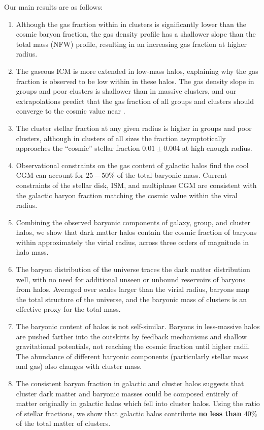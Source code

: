 Our main results are as follows:
\begin{enumerate}
\item Although the gas fraction within \rfive{} in clusters is
  significantly lower than the cosmic baryon fraction, the gas density
  profile has a shallower slope than the total mass (NFW) profile,
  resulting in an increasing gas fraction at higher radius. 
\item The gaseous ICM is more extended in low-mass halos, explaining
  why the gas fraction is observed to be low within \rfive{} in these
  halos. The gas density slope in groups and poor clusters is
  shallower than in massive clusters, and our extrapolations predict that
  the gas fraction of all groups and clusters should converge to the
  cosmic value near \rvir{}.
\item The cluster stellar fraction at any given radius is higher in
  groups and poor clusters, although in clusters of all sizes the
  fraction asymptotically approaches the ``cosmic'' stellar fraction
  $0.01\pm0.004$ at high enough radius. 
\item Observational constraints on the gas content of galactic halos
  find the cool CGM can account for $25-50\%$ of the total baryonic
  mass. Current constraints of the stellar disk, ISM, and multiphase
  CGM are consistent with the galactic baryon fraction matching the
  cosmic value within the viral radius. 
\item Combining the observed baryonic components of galaxy, group, and
  cluster halos, we show that dark matter halos contain the cosmic
  fraction of baryons within approximately the virial radius, across
  three orders of magnitude in halo mass. 
\item The baryon distribution of the universe traces the dark matter
  distribution well, with no need for additional unseen or unbound
  reservoirs of baryons from halos. Averaged over scales larger than
  the virial radius, baryons map the total structure of the universe,
  and the baryonic mass of clusters is an effective proxy for the
  total mass.
\item The baryonic content of halos is not self-similar. Baryons in
  less-massive halos are pushed farther into the outskirts by feedback
  mechanisms and shallow gravitational potentials, not reaching the
  cosmic fraction until higher radii. The abundance of different
  baryonic components (particularly stellar mass and gas) also changes
  with cluster mass.
\item The consistent baryon fraction in galactic and cluster halos
  suggests that cluster dark matter and baryonic masses could be
  composed entirely of matter originally in galactic halos which fell
  into cluster halos. Using the ratio of stellar fractions, we
  show that galactic halos contribute \textbf{no less than $40\%$} of
  the total matter of clusters. 
\end{enumerate}

